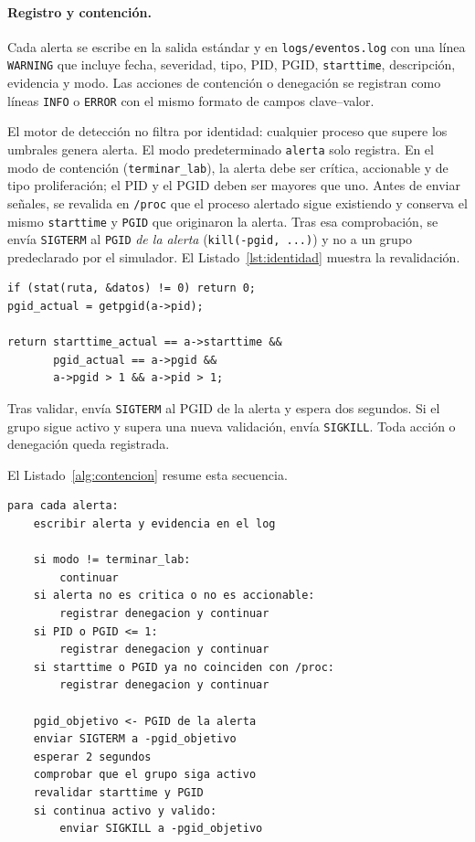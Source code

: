 \paragraph{Registro y contención.}

Cada alerta se escribe en la salida estándar y en \texttt{logs/eventos.log} con
una línea \texttt{WARNING} que incluye fecha, severidad, tipo, PID, PGID,
\texttt{starttime}, descripción, evidencia y modo. Las acciones de contención o
denegación se registran como líneas \texttt{INFO} o \texttt{ERROR} con el mismo
formato de campos clave--valor.

El motor de detección no filtra por identidad: cualquier proceso que supere los
umbrales genera alerta. El modo predeterminado \texttt{alerta} solo registra. En
el modo de contención (\texttt{terminar\_lab}), la alerta debe ser crítica,
accionable y de tipo proliferación; el PID y el PGID deben ser mayores que uno.
Antes de enviar señales, se revalida en \texttt{/proc} que el proceso alertado
sigue existiendo y conserva el mismo \texttt{starttime} y \texttt{PGID} que
originaron la alerta. Tras esa comprobación, se envía \texttt{SIGTERM} al
\texttt{PGID} \emph{de la alerta} (\texttt{kill(-pgid, ...)}) y no a un grupo
predeclarado por el simulador. El Listado~\ref{lst:identidad} muestra la
revalidación.

\begin{lstlisting}[style=codigoC,caption={Revalidación de identidad antes de contener (\texttt{respuesta.c}).},label={lst:identidad}]
if (stat(ruta, &datos) != 0) return 0;
pgid_actual = getpgid(a->pid);

return starttime_actual == a->starttime &&
       pgid_actual == a->pgid &&
       a->pgid > 1 && a->pid > 1;
\end{lstlisting}

Tras validar, envía \texttt{SIGTERM} al PGID de la alerta y espera dos segundos. Si el grupo
sigue activo y supera una nueva validación, envía \texttt{SIGKILL}. Toda acción
o denegación queda registrada.

El Listado~\ref{alg:contencion} resume esta secuencia.

\begin{lstlisting}[style=pseudocodigo,caption={Contención gradual del PGID de la alerta.},label={alg:contencion}]
para cada alerta:
    escribir alerta y evidencia en el log

    si modo != terminar_lab:
        continuar
    si alerta no es critica o no es accionable:
        registrar denegacion y continuar
    si PID o PGID <= 1:
        registrar denegacion y continuar
    si starttime o PGID ya no coinciden con /proc:
        registrar denegacion y continuar

    pgid_objetivo <- PGID de la alerta
    enviar SIGTERM a -pgid_objetivo
    esperar 2 segundos
    comprobar que el grupo siga activo
    revalidar starttime y PGID
    si continua activo y valido:
        enviar SIGKILL a -pgid_objetivo
\end{lstlisting}

